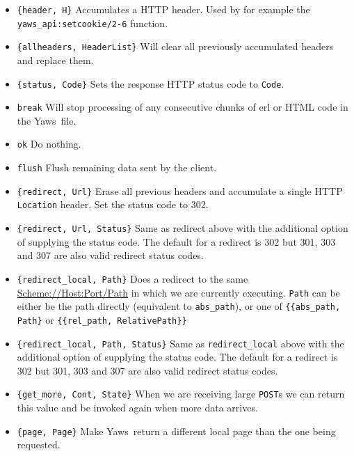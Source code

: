 \documentclass[11pt,oneside,english]{book}
\newcommand{\Yaws}            %
        {{\sc Yaws}}
\begin{document}
\begin{itemize}
\item \verb+{header, H}+ Accumulates a HTTP header. Used by for
  example the \verb+yaws_api:setcookie/2-6+ function.

\item \verb+{allheaders, HeaderList}+ Will clear all previously
  accumulated headers and replace them.

\item \verb+{status, Code}+ Sets the response HTTP status code to
  \verb+Code+.

\item \verb+break+ Will stop processing of any consecutive chunks of
  erl or HTML code in the \Yaws\ file.

\item \verb+ok+ Do nothing.

\item \verb+flush+ Flush remaining data sent by the client.

\item \verb+{redirect, Url}+ Erase all previous headers and accumulate
  a single HTTP \verb+Location+ header. Set the status code to 302.

\item \verb+{redirect, Url, Status}+ Same as redirect above with the
  additional option of supplying the status code. The default for a
  redirect is 302 but 301, 303 and 307 are also valid redirect status
  codes.

\item \verb+{redirect_local, Path}+ Does a redirect to the same
  \url{Scheme://Host:Port/Path} in which we are currently
  executing. \verb+Path+ can be either be the path directly
  (equivalent to \verb+abs_path+), or one of \verb+{{abs_path, Path}+
  or \verb+{{rel_path, RelativePath}}+

\item \verb+{redirect_local, Path, Status}+ Same as
  \verb+redirect_local+ above with the additional option of supplying
  the status code. The default for a redirect is 302 but 301, 303 and
  307 are also valid redirect status codes.

\item \verb+{get_more, Cont, State}+ When we are receiving large
  \verb+POST+s we can return this value and be invoked again when more
  data arrives.

\item \verb+{page, Page}+ Make \Yaws\ return a different local page
  than the one being requested.


\end{itemize}
\end{document}
